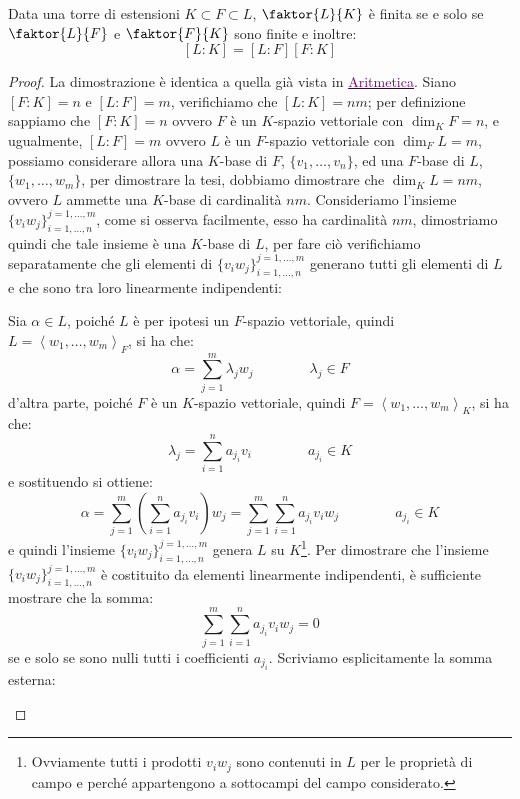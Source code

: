 \documentclass[11pt]{scrartcl}
\begin{document}
\begin{proposition}
    \label{torri}
    Data una torre di estensioni $K \subset F \subset L$, $\faktor{L}{K}$ è finita se e solo se $\faktor{L}{F}$ e $\faktor{F}{K}$ sono finite e inoltre:
    \[ [L:K] = [L:F][F:K]
        \]
\end{proposition}

\begin{proof}
    La dimostrazione è identica a quella già vista in \href{https://github.com/diego-unipi/Appunti-Aritmetica}{\textcolor{purple}{Aritmetica}}. Siano $[F:K] = n$ e $[L:F] = m$, verifichiamo che $[L:K]=nm$;
    per definizione sappiamo che $[F:K] = n$ ovvero $F$ è un $K$-spazio vettoriale con $\dim_KF = n$, e ugualmente, $[L:F] = m$ ovvero $L$ è un $F$-spazio vettoriale con $\dim_FL = m$, possiamo considerare allora una $K$-base di $F$, $\{v_1,\ldots,v_n\}$, ed una $F$-base di $L$, $\{w_1,\ldots,w_m\}$, per dimostrare la tesi, dobbiamo dimostrare che $\dim_KL = nm$, ovvero $L$ ammette una $K$-base di cardinalità $nm$. Consideriamo l'insieme $\{v_iw_j\}_{i=1,\ldots,n}^{j=1,\ldots,m}$, come si osserva facilmente, esso ha cardinalità $nm$, dimostriamo quindi che tale insieme è una $K$-base di $L$, per fare ciò verifichiamo separatamente che gli elementi di $\{v_iw_j\}_{i=1,\ldots,n}^{j=1,\ldots,m}$ generano tutti gli elementi di $L$ e che sono tra loro linearmente indipendenti:
	\begin{itemize}
	\ii Sia $\alpha \in L$, poiché $L$ è per ipotesi un $F$-spazio vettoriale, quindi $L = \left<w_1,\ldots,w_m\right>_F$, si ha che:
		\[ \alpha = \sum_{j=1}^{m} \lambda_jw_j
		\qquad\qquad \lambda_j \in F
		\]
		d'altra parte, poiché $F$ è un $K$-spazio vettoriale, quindi $F = \left<w_1,\ldots,w_m\right>_K$, si ha che:
		\[ \lambda_j = \sum_{i=1}^{n} a_{j_i}v_i
		\qquad\qquad a_{j_i} \in K
		\]
		e sostituendo si ottiene:
		\[ \alpha = \sum_{j=1}^{m} \left( \sum_{i=1}^{n} a_{j_i}v_i\right)w_j = \sum_{j=1}^{m}\sum_{i=1}^{n} a_{j_i}v_iw_j
		\qquad\qquad a_{j_i} \in K
		\]
    e quindi l'insieme $\{v_iw_j\}_{i=1,\ldots,n}^{j=1,\ldots,m}$ genera $L$ su $K$\footnote{Ovviamente tutti i prodotti $v_iw_j$ sono contenuti in $L$ per le proprietà di campo e perché appartengono a sottocampi del campo considerato.}.
	\ii Per dimostrare che l'insieme $\{v_iw_j\}_{i=1,\ldots,n}^{j=1,\ldots,m}$ è costituito da elementi linearmente indipendenti, è sufficiente mostrare che la somma:
		\[ \sum_{j=1}^{m}\sum_{i=1}^{n} a_{j_i}v_iw_j = 0
		\]
    se e solo se sono nulli tutti i coefficienti $a_{j_i}$. Scriviamo esplicitamente la somma esterna:

\end{itemize}
\end{proof}
\end{document}
